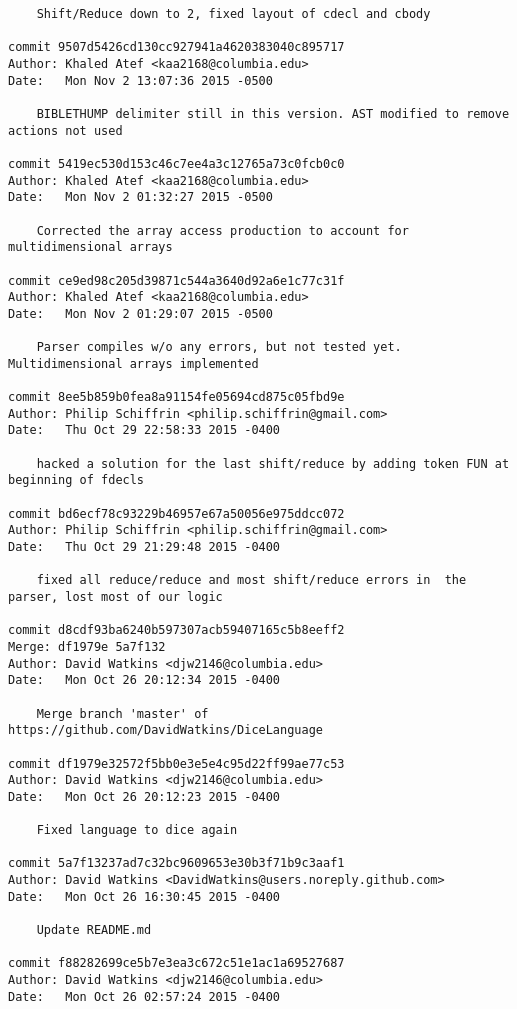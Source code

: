 \begin{verbatim}
    Shift/Reduce down to 2, fixed layout of cdecl and cbody

commit 9507d5426cd130cc927941a4620383040c895717
Author: Khaled Atef <kaa2168@columbia.edu>
Date:   Mon Nov 2 13:07:36 2015 -0500

    BIBLETHUMP delimiter still in this version. AST modified to remove actions not used

commit 5419ec530d153c46c7ee4a3c12765a73c0fcb0c0
Author: Khaled Atef <kaa2168@columbia.edu>
Date:   Mon Nov 2 01:32:27 2015 -0500

    Corrected the array access production to account for multidimensional arrays

commit ce9ed98c205d39871c544a3640d92a6e1c77c31f
Author: Khaled Atef <kaa2168@columbia.edu>
Date:   Mon Nov 2 01:29:07 2015 -0500

    Parser compiles w/o any errors, but not tested yet. Multidimensional arrays implemented

commit 8ee5b859b0fea8a91154fe05694cd875c05fbd9e
Author: Philip Schiffrin <philip.schiffrin@gmail.com>
Date:   Thu Oct 29 22:58:33 2015 -0400

    hacked a solution for the last shift/reduce by adding token FUN at beginning of fdecls

commit bd6ecf78c93229b46957e67a50056e975ddcc072
Author: Philip Schiffrin <philip.schiffrin@gmail.com>
Date:   Thu Oct 29 21:29:48 2015 -0400

    fixed all reduce/reduce and most shift/reduce errors in  the parser, lost most of our logic

commit d8cdf93ba6240b597307acb59407165c5b8eeff2
Merge: df1979e 5a7f132
Author: David Watkins <djw2146@columbia.edu>
Date:   Mon Oct 26 20:12:34 2015 -0400

    Merge branch 'master' of https://github.com/DavidWatkins/DiceLanguage

commit df1979e32572f5bb0e3e5e4c95d22ff99ae77c53
Author: David Watkins <djw2146@columbia.edu>
Date:   Mon Oct 26 20:12:23 2015 -0400

    Fixed language to dice again

commit 5a7f13237ad7c32bc9609653e30b3f71b9c3aaf1
Author: David Watkins <DavidWatkins@users.noreply.github.com>
Date:   Mon Oct 26 16:30:45 2015 -0400

    Update README.md

commit f88282699ce5b7e3ea3c672c51e1ac1a69527687
Author: David Watkins <djw2146@columbia.edu>
Date:   Mon Oct 26 02:57:24 2015 -0400


\end{verbatim}
